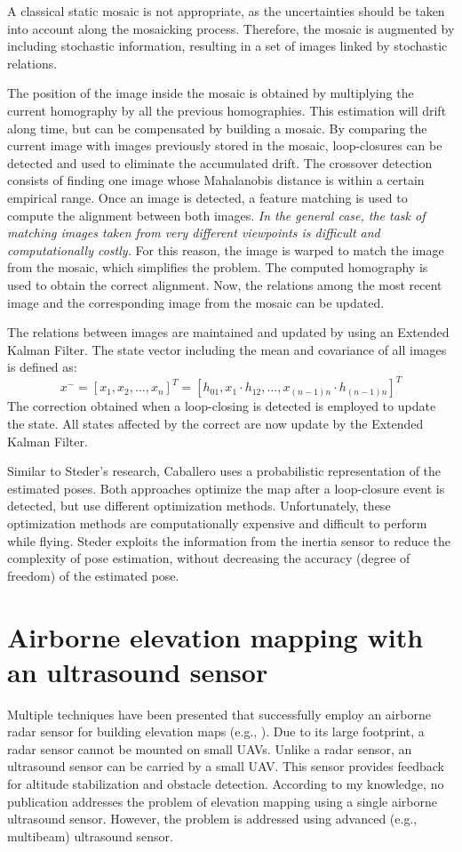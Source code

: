 A classical static mosaic is not appropriate, as the uncertainties should be taken into account along the mosaicking process.
Therefore, the mosaic is augmented by including stochastic information, resulting in a set of images linked by stochastic relations.

The position of the image inside the mosaic is obtained by multiplying the current homography by all the previous homographies.
This estimation will drift along time, but can be compensated by building a mosaic.
By comparing the current image with images previously stored in the mosaic, loop-closures can be detected and used to eliminate the accumulated drift.
The crossover detection consists of finding one image whose Mahalanobis distance is within a certain empirical range.
Once an image is detected, a feature matching is used to compute the alignment between both images. 
\textit{In the general case, the task of matching images taken from very different viewpoints is difficult and computationally costly.}
For this reason, the image is warped to match the image from the mosaic, which simplifies the problem.
The computed homography is used to obtain the correct alignment.
Now, the relations among the most recent image and the corresponding image from the mosaic can be updated.

The relations between images are maintained and updated by using an Extended Kalman Filter.
The state vector including the mean and covariance of all images is defined as:
\begin{equation}
x^{-} = [x_1, x_2, ..., x_n]^T = [h_{01}, x_1 \cdot h_{12}, ..., x_{(n-1)n} \cdot h_{(n-1)n}]^T
\end{equation}
The correction obtained when a loop-closing is detected is employed to update the state.
All states affected by the correct are now update by the Extended Kalman Filter.

Similar to Steder's research, Caballero uses a probabilistic representation of the estimated poses.
Both approaches optimize the map after a loop-closure event is detected, but use different optimization methods.
Unfortunately, these optimization methods are computationally expensive and difficult to perform while flying.
Steder exploits the information from the inertia sensor to reduce the complexity of pose estimation, without decreasing the accuracy (degree of freedom) of the estimated pose.



\section{Airborne elevation mapping with an ultrasound sensor}
Multiple techniques have been presented that successfully employ an airborne radar sensor for building elevation maps (e.g., \cite{foessel2000radar, weiß2006airborne}).
Due to its large footprint, a radar sensor cannot be mounted on small UAVs.
Unlike a radar sensor, an ultrasound sensor can be carried by a small UAV.
This sensor provides feedback for altitude stabilization and obstacle detection.
According to my knowledge, no publication addresses the problem of elevation mapping using a single airborne ultrasound sensor.
However, the problem is addressed using advanced (e.g., multibeam) ultrasound sensor.

